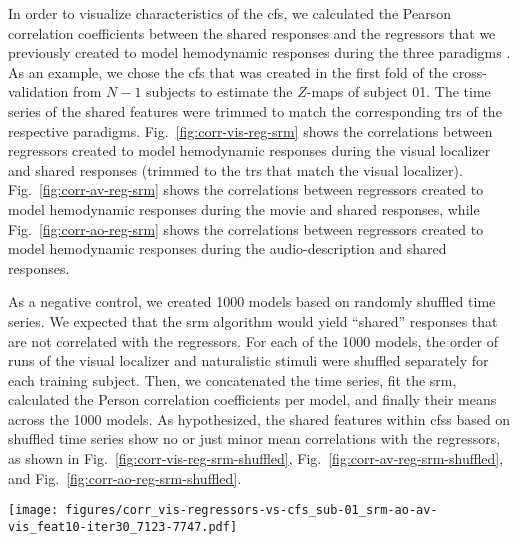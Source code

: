 In order to visualize characteristics of the \ac{cfs}, we calculated the Pearson
correlation coefficients between the shared responses and the regressors that we
previously created to model hemodynamic responses during the three paradigms
\citep[cf.][]{sengupta2016extension, haeusler2022processing}.
%
As an example, we chose the \ac{cfs} that was created in the first fold of the
cross-validation from $N-1$ subjects to estimate the $Z$-maps of subject 01.
%
The time series of the shared features were trimmed to match the corresponding
\acp{tr} of the respective paradigms.
%
Fig.~\ref{fig:corr-vis-reg-srm} shows the correlations between regressors
created to model hemodynamic responses during the visual localizer and shared
responses (trimmed to the \acp{tr} that match the visual localizer).
Fig.~\ref{fig:corr-av-reg-srm} shows the correlations between regressors created
to model hemodynamic responses during the movie \citep[cf. Table 3
in][]{haeusler2022processing} and shared responses, while
Fig.~\ref{fig:corr-ao-reg-srm} shows the correlations between regressors created
to model hemodynamic responses during the audio-description \citep[cf. Table 3
in][]{haeusler2022processing} and shared responses.

As a negative control, we created 1000 models based on randomly shuffled time
series.
%
We expected that the \ac{srm} algorithm would yield ``shared'' responses that
are not correlated with the regressors.
%
For each of the 1000 models, the order of runs of the visual localizer and
naturalistic stimuli were shuffled separately for each training subject.
%
Then, we concatenated the time series, fit the \ac{srm}, calculated the Person
correlation coefficients per model, and finally their means across the 1000
models.
%
As hypothesized, the shared features within \acp{cfs} based on shuffled time
series show no or just minor mean correlations with the regressors, as shown in
%
Fig.~\ref{fig:corr-vis-reg-srm-shuffled},
%
Fig.~\ref{fig:corr-av-reg-srm-shuffled}, and
%
Fig.~\ref{fig:corr-ao-reg-srm-shuffled}.


\begin{figure*}[tbp]
\centering
\texttt{[image: figures/corr\_vis-regressors-vs-cfs\_sub-01\_srm-ao-av-vis\_feat10-iter30\_7123-7747.pdf]}
\caption{
%
\textbf{Similarity of hemodynamic reponses modeled for the analysis of
    visual localizer in \citet{sengupta2016extension} and shared features
    calculated by the shared response model (SRM) for subject 01 in the first
    fold of the cross-validation.}
    Before calculating the Pearson correlation coefficients plotted in the
    figure, the time series of the shared features within the multi-paradigm
    \ac{cfs} were trimmed to match the corresponding \acp{tr} of the visual
    localizer paradigm \citep{sengupta2016extension}.
    The modeled hemodynamic responses represent predicted responses to
    the six categories of pictures that were presented in blocks.
    }
\label{fig:corr-vis-reg-srm}
\end{figure*}


